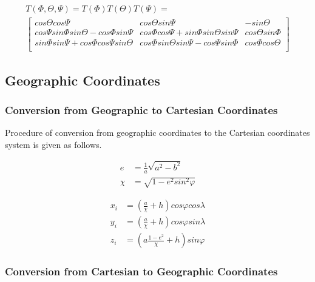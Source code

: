 \begin{equation}
  \begin{array}{c}
  T \left( \Phi,\Theta,\Psi \right) =
  T \left( \Phi \right) T \left( \Theta \right)  T \left( \Psi \right) = \\
  \left[
    \begin{matrix}
      cos \Theta cos \Psi &
      cos\Theta sin\Psi &
      -sin\Theta \\
      cos \Psi sin \Phi sin \Theta - cos \Phi sin\Psi &
      cos\Phi cos\Psi + sin \Phi sin \Theta sin\Psi &
      cos\Theta sin\Phi \\
      sin \Phi sin \Psi + cos \Phi cos \Psi sin\Theta &
      cos\Phi sin\Theta sin\Psi - cos\Psi sin\Phi &
      cos\Phi cos\Theta \\
    \end{matrix}
  \right]
  \end{array}
\end{equation}

\subsection{Geographic Coordinates}

\subsubsection{Conversion from Geographic to Cartesian Coordinates}

Procedure of conversion from geographic coordinates to the Cartesian coordinates system is given as follows.

\begin{align}
  e    &= \frac{1}{a} \sqrt{a^2-b^2} \\
  \chi &= \sqrt{ 1 - e^2 sin^2 \varphi }
\end{align}

\begin{align}
  x_i &= \left( \frac{a}{\chi} + h \right) cos\varphi cos\lambda \\
  y_i &= \left( \frac{a}{\chi} + h \right) cos\varphi sin\lambda \\
  z_i &= \left( a \frac{1-e^2}{\chi} + h \right) sin\varphi
\end{align}

\subsubsection{Conversion from Cartesian to Geographic Coordinates}


